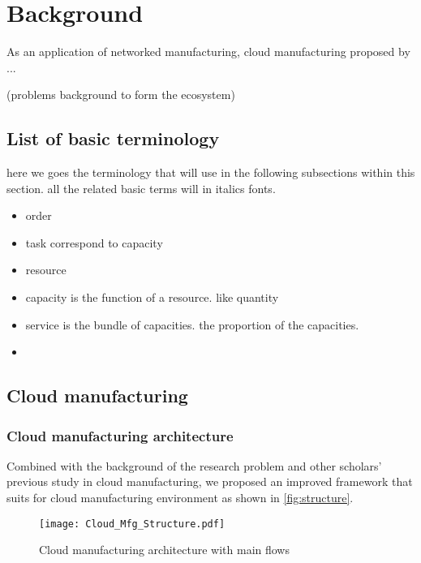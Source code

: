 \section{Background} %
\label{sec:background}

As an application of networked manufacturing, cloud manufacturing proposed by ...

(problems background to form the ecosystem)

\subsection{List of basic terminology} %
\label{sub:list_of_basic_terminology}
here we goes the terminology that will use in the following subsections within this section. all the related basic terms will in italics fonts.
\begin{itemize}
	\item order
	\item task correspond to capacity
	\item resource
	\item capacity is the function of a resource. like quantity
	\item service is the bundle of capacities. the proportion of the capacities.
	\item 
\end{itemize}

\subsection{Cloud manufacturing} %
\label{sub:cloud_manufacturing}

\subsubsection{Cloud manufacturing architecture}
\label{subs:cloud manufacturing architecture}
Combined with the background of the research problem and other scholars' previous study in cloud manufacturing, we proposed an improved framework that suits for cloud manufacturing environment as shown in \autoref{fig:structure}.
\begin{figure}[htbp]
\centering
\texttt{[image: Cloud\_Mfg\_Structure.pdf]}
\caption{Cloud manufacturing architecture with main flows}
\label{fig:structure}
\end{figure}

